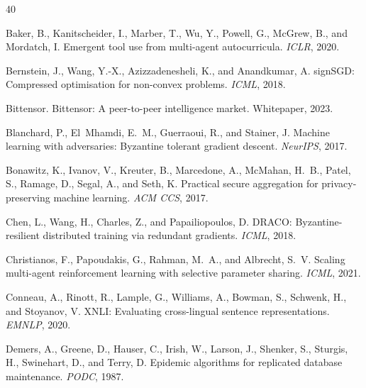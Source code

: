 \documentclass[11pt]{article}
\begin{document}

\begin{thebibliography}{40}

Baker, B., Kanitscheider, I., Marber, T., Wu, Y., Powell, G., McGrew, B.,
  and Mordatch, I.
\newblock Emergent tool use from multi-agent autocurricula.
\newblock \emph{ICLR}, 2020.

Bernstein, J., Wang, Y.-X., Azizzadenesheli, K., and Anandkumar, A.
\newblock signSGD: Compressed optimisation for non-convex problems.
\newblock \emph{ICML}, 2018.

Bittensor.
\newblock Bittensor: A peer-to-peer intelligence market.
\newblock Whitepaper, 2023.

Blanchard, P., El~Mhamdi, E.~M., Guerraoui, R., and Stainer, J.
\newblock Machine learning with adversaries: Byzantine tolerant gradient
  descent.
\newblock \emph{NeurIPS}, 2017.

Bonawitz, K., Ivanov, V., Kreuter, B., Marcedone, A., McMahan, H.~B.,
  Patel, S., Ramage, D., Segal, A., and Seth, K.
\newblock Practical secure aggregation for privacy-preserving machine learning.
\newblock \emph{ACM CCS}, 2017.

Chen, L., Wang, H., Charles, Z., and Papailiopoulos, D.
\newblock DRACO: Byzantine-resilient distributed training via redundant
  gradients.
\newblock \emph{ICML}, 2018.

Christianos, F., Papoudakis, G., Rahman, M.~A., and Albrecht, S.~V.
\newblock Scaling multi-agent reinforcement learning with selective parameter
  sharing.
\newblock \emph{ICML}, 2021.

Conneau, A., Rinott, R., Lample, G., Williams, A., Bowman, S., Schwenk, H.,
  and Stoyanov, V.
\newblock XNLI: Evaluating cross-lingual sentence representations.
\newblock \emph{EMNLP}, 2020.

Demers, A., Greene, D., Hauser, C., Irish, W., Larson, J., Shenker, S.,
  Sturgis, H., Swinehart, D., and Terry, D.
\newblock Epidemic algorithms for replicated database maintenance.
\newblock \emph{PODC}, 1987.


\end{thebibliography}
\end{document}
